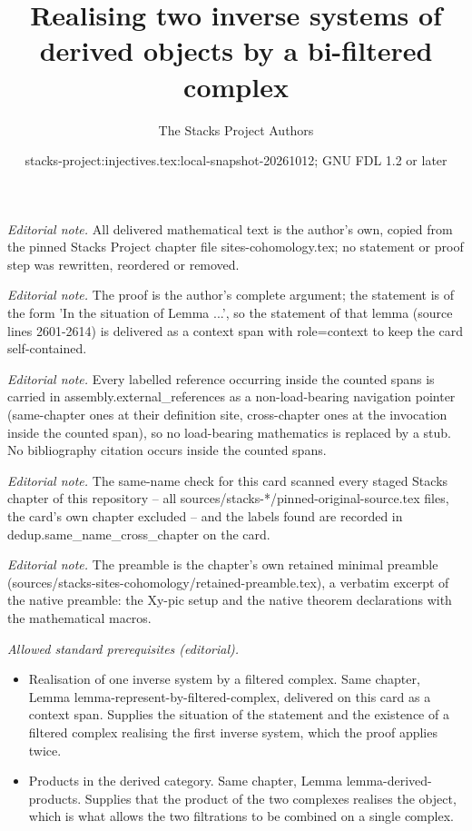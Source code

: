 \documentclass[10pt,a4paper]{amsart}
\title{Realising two inverse systems of derived objects by a bi-filtered complex}
\author{The Stacks Project Authors}
\date{stacks-project:injectives.tex:local-snapshot-20261012; GNU FDL 1.2 or later}
\theoremstyle{plain}
\theoremstyle{definition}
\theoremstyle{remark}
\numberwithin{equation}{subsection}
\begin{document}
\maketitle
\noindent\textit{Editorial note.} All delivered mathematical text is the author's own, copied from the pinned Stacks Project chapter file sites-cohomology.tex; no statement or proof step was rewritten, reordered or removed.\par\medskip
\noindent\textit{Editorial note.} The proof is the author's complete argument; the statement is of the form 'In the situation of Lemma ...', so the statement of that lemma (source lines 2601-2614) is delivered as a context span with role=context to keep the card self-contained.\par\medskip
\noindent\textit{Editorial note.} Every labelled reference occurring inside the counted spans is carried in assembly.external\_references as a non-load-bearing navigation pointer (same-chapter ones at their definition site, cross-chapter ones at the invocation inside the counted span), so no load-bearing mathematics is replaced by a stub. No bibliography citation occurs inside the counted spans.\par\medskip
\noindent\textit{Editorial note.} The same-name check for this card scanned every staged Stacks chapter of this repository -- all sources/stacks-*/pinned-original-source.tex files, the card's own chapter excluded -- and the labels found are recorded in dedup.same\_name\_cross\_chapter on the card.\par\medskip
\noindent\textit{Editorial note.} The preamble is the chapter's own retained minimal preamble (sources/stacks-sites-cohomology/retained-preamble.tex), a verbatim excerpt of the native preamble: the Xy-pic setup and the native theorem declarations with the mathematical macros.\par\medskip
\noindent\textit{Allowed standard prerequisites (editorial).}\begin{itemize}
\item Realisation of one inverse system by a filtered complex. Same chapter, Lemma lemma-represent-by-filtered-complex, delivered on this card as a context span. Supplies the situation of the statement and the existence of a filtered complex realising the first inverse system, which the proof applies twice.
\item Products in the derived category. Same chapter, Lemma lemma-derived-products. Supplies that the product of the two complexes realises the object, which is what allows the two filtrations to be combined on a single complex.
\end{itemize}\medskip
\end{document}
